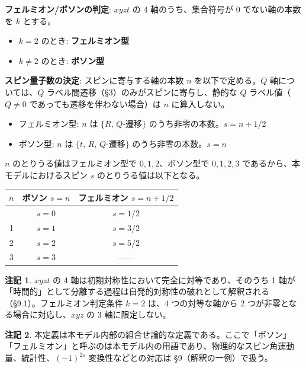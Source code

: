 \documentclass[
  a4paper,11pt]{ltjsarticle}
\newcounter{none}
\providecommand{\tightlist}{%
  \setlength{\itemsep}{0pt}\setlength{\parskip}{0pt}}
\theoremstyle{definition}
\theoremstyle{remark}
\begin{document}
\textbf{フェルミオン/ボソンの判定}: \(xyzt\) の 4 軸のうち、集合符号が
\(0\) でない軸の本数を \(k\) とする。

\begin{itemize}
\tightlist
\item
  \(k = 2\) のとき: \textbf{フェルミオン型}
\item
  \(k \neq 2\) のとき: \textbf{ボソン型}
\end{itemize}

\textbf{スピン量子数の決定}: スピンに寄与する軸の本数 \(n\)
を以下で定める。\(Q\) 軸については、\(Q\)
ラベル間遷移（§3）のみがスピンに寄与し、静的な \(Q\)
ラベル値（\(Q \neq 0\) であっても遷移を伴わない場合）は \(n\)
に算入しない。

\begin{itemize}
\tightlist
\item
  フェルミオン型: \(n\) は \(\{R,\, Q\text{-遷移}\}\)
  のうち非零の本数。\(s = n + 1/2\)
\item
  ボソン型: \(n\) は \(\{t,\, R,\, Q\text{-遷移}\}\)
  のうち非零の本数。\(s = n\)
\end{itemize}

\(n\) のとりうる値はフェルミオン型で \(0, 1, 2\)、ボソン型で
\(0, 1, 2, 3\) であるから、本モデルにおけるスピン \(s\)
のとりうる値は以下となる。

{\def\LTcaptype{none} %
\begin{longtable}[]{@{}ccc@{}}
\toprule\noalign{}
\(n\) & ボソン \(s = n\) & フェルミオン \(s = n + 1/2\) \\
\midrule\noalign{}
\endhead
\bottomrule\noalign{}
\endlastfoot
0 & \(s = 0\) & \(s = 1/2\) \\
1 & \(s = 1\) & \(s = 3/2\) \\
2 & \(s = 2\) & \(s = 5/2\) \\
3 & \(s = 3\) & ------ \\
\end{longtable}
}

\textbf{注記 1}. \(xyzt\) の 4
軸は初期対称性において完全に対等であり、そのうち 1
軸が「時間的」として分離する過程は自発的対称性の破れとして解釈される（§9.1）。フェルミオン判定条件
\(k = 2\) は、4 つの対等な軸から 2 つが非零となる場合に対応し、\(xyz\)
の 3 軸に限定しない。

\textbf{注記 2}.
本定義は本モデル内部の組合せ論的な定義である。ここで「ボソン」「フェルミオン」と呼ぶのは本モデル内の用語であり、物理的なスピン角運動量、統計性、\((-1)^{2s}\)
変換性などとの対応は §9（解釈の一例）で扱う。
\end{document}
